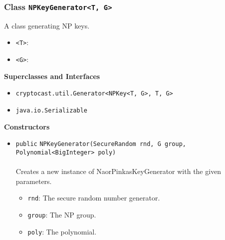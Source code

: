 \subsubsection{Class \lstinline|NPKeyGenerator<T, G>|}
A class generating NP keys. \\
\noindent\begin{minipage}[t]{5cm}
\vspace{0.3em}
\hspace*{2em}
\vspace{0.3em}
\end{minipage}

\begin{itemize}
\item \lstinline|<T>|: 
\item \lstinline|<G>|: 
\end{itemize}


\textbf{\sffamily Superclasses and Interfaces}
\begin{itemize}
\item \lstinline|cryptocast.util.Generator<NPKey<T, G>, T, G>|
\item \lstinline|java.io.Serializable|
\end{itemize}


\textbf{\sffamily Constructors}
\begin{itemize}
\item \lstinline|public| \lstinline|NPKeyGenerator|\lstinline|(SecureRandom rnd, G group, Polynomial<BigInteger> poly)|\\ \\[-0.6em]
Creates a new instance of NaorPinkasKeyGenerator with the given parameters.
\begin{itemize}
\item \lstinline|rnd|: The secure random number generator.
\item \lstinline|group|: The NP group.
\item \lstinline|poly|: The polynomial.
\end{itemize}



\end{itemize}


